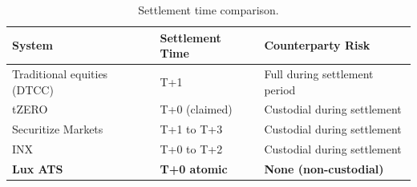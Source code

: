 \begin{table}[H]
\centering
\caption{Settlement time comparison.}
\label{tab:settlement}
\begin{tabular}{lll}
\toprule
\textbf{System} & \textbf{Settlement Time} & \textbf{Counterparty Risk} \\
\midrule
Traditional equities (DTCC) & T+1 & Full during settlement period \\
tZERO & T+0 (claimed) & Custodial during settlement \\
Securitize Markets & T+1 to T+3 & Custodial during settlement \\
INX & T+0 to T+2 & Custodial during settlement \\
\textbf{Lux ATS} & \textbf{T+0 atomic} & \textbf{None (non-custodial)} \\
\bottomrule
\end{tabular}
\end{table}

